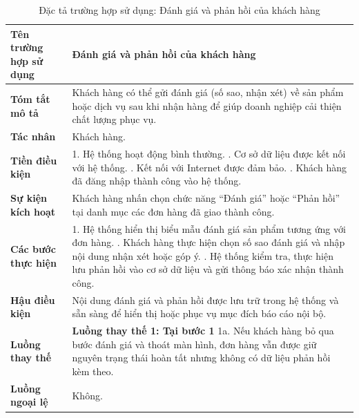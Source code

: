 \begin{longtable}{|>{\bfseries}p{4cm}|p{11.5cm}|}
\caption{Đặc tả trường hợp sử dụng: Đánh giá và phản hồi của khách hàng}
\label{tab:uc-customer-review} \\
\hline
\textbf{Tên trường hợp sử dụng} & Đánh giá và phản hồi của khách hàng \\
\hline
\textbf{Tóm tắt mô tả} & Khách hàng có thể gửi đánh giá (số sao, nhận xét) về sản phẩm hoặc dịch vụ sau khi nhận hàng để giúp doanh nghiệp cải thiện chất lượng phục vụ. \\
\hline
\textbf{Tác nhân} & Khách hàng. \\
\hline
\textbf{Tiền điều kiện} & 1. Hệ thống hoạt động bình thường. \newline
2. Cơ sở dữ liệu được kết nối với hệ thống. \newline
3. Kết nối với Internet được đảm bảo. \newline
4. Khách hàng đã đăng nhập thành công vào hệ thống. \\
\hline
\textbf{Sự kiện kích hoạt} & Khách hàng nhấn chọn chức năng “Đánh giá” hoặc “Phản hồi” tại danh mục các đơn hàng đã giao thành công. \\
\hline
\textbf{Các bước thực hiện} & 1. Hệ thống hiển thị biểu mẫu đánh giá sản phẩm tương ứng với đơn hàng. \newline
2. Khách hàng thực hiện chọn số sao đánh giá và nhập nội dung nhận xét hoặc góp ý. \newline
3. Hệ thống kiểm tra, thực hiện lưu phản hồi vào cơ sở dữ liệu và gửi thông báo xác nhận thành công. \\
\hline
\textbf{Hậu điều kiện} & Nội dung đánh giá và phản hồi được lưu trữ trong hệ thống và sẵn sàng để hiển thị hoặc phục vụ mục đích báo cáo nội bộ. \\
\hline
\textbf{Luồng thay thế} & \textbf{Luồng thay thế 1: Tại bước 1} \newline
1a. Nếu khách hàng bỏ qua bước đánh giá và thoát màn hình, đơn hàng vẫn được giữ nguyên trạng thái hoàn tất nhưng không có dữ liệu phản hồi kèm theo. \\
\hline
\textbf{Luồng ngoại lệ} & Không. \\
\hline
\end{longtable}

